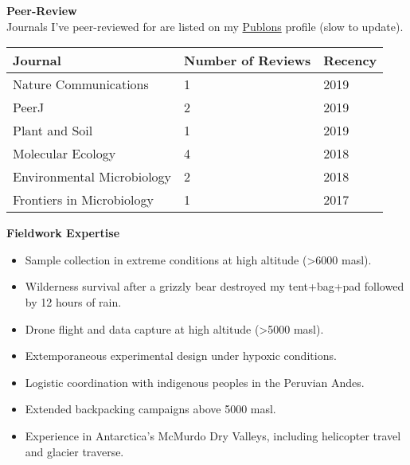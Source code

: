 \documentclass{article}
\begin{document}
{\large  \textbf{Peer-Review}}\\
Journals I've peer-reviewed for are listed on my \href{https://publons.com/researcher/1262170/john-l-darcy/peer-review/}{Publons} profile (slow to update). 
\\\begin{tabular}{l l l}
  Journal & Number of Reviews & Recency\\
  \hline
  Nature Communications & 1 & 2019\\
  PeerJ & 2 & 2019\\
  Plant and Soil & 1 & 2019\\
  Molecular Ecology & 4 & 2018\\
  Environmental Microbiology & 2 & 2018\\
  Frontiers in Microbiology & 1 & 2017\\
\end{tabular}

\vspace{3mm}
{\large  \textbf{Fieldwork Expertise}}
\begin{itemize}[noitemsep,topsep=0pt, leftmargin=5mm]
  \item Sample collection in extreme conditions at high altitude (>6000 masl).
  \item Wilderness survival after a grizzly bear destroyed my tent+bag+pad followed by 12 hours of rain.
  \item Drone flight and data capture at high altitude (>5000 masl).
  \item Extemporaneous experimental design under hypoxic conditions.
  \item Logistic coordination with indigenous peoples in the Peruvian Andes.
  \item Extended backpacking campaigns above 5000 masl.
  \item Experience in Antarctica’s McMurdo Dry Valleys, including helicopter travel and glacier traverse.
\end{itemize}
\end{document}
